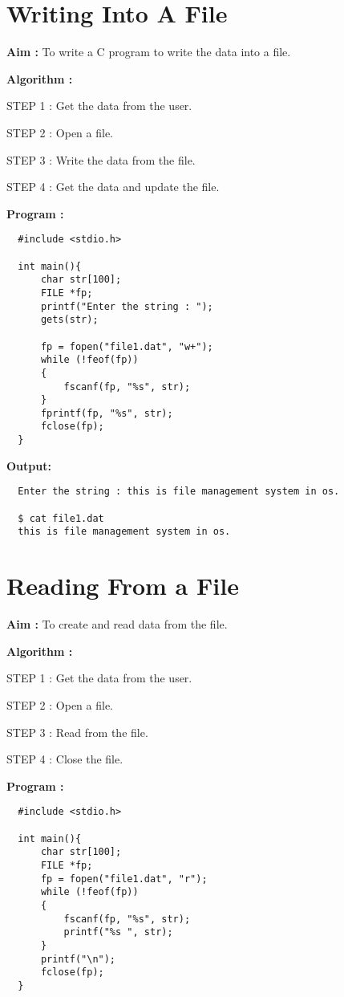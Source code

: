 \documentclass[journal,onecolumn]{IEEEtran}
\begin{document}
\section{Writing Into A File}
\textbf{Aim : } To write a C program to write the data into a file.

\textbf{Algorithm : }
\begin{list}{}{}
  \item STEP 1 : Get the data from the user. 
  \item STEP 2 : Open a file.
  \item STEP 3 : Write the data from the file. 
  \item STEP 4 : Get the data and update the file.
\end{list}

\textbf{Program : }
\begin{verbatim}
  #include <stdio.h>

  int main(){
      char str[100];
      FILE *fp;
      printf("Enter the string : ");
      gets(str);
      
      fp = fopen("file1.dat", "w+");
      while (!feof(fp))
      {
          fscanf(fp, "%s", str);
      }
      fprintf(fp, "%s", str);
      fclose(fp);
  }
\end{verbatim}

\textbf{Output:}
\begin{verbatim}
  Enter the string : this is file management system in os.

  $ cat file1.dat 
  this is file management system in os.
\end{verbatim}

\section{Reading From a File}
\textbf{Aim :} To create and read data from the file.

\textbf{Algorithm :}
\begin{list}{}{}
  \item STEP 1 : Get the data from the user.
  \item STEP 2 : Open a file.
  \item STEP 3 : Read from the file. 
  \item STEP 4 : Close the file.
\end{list}


\textbf{Program :}
\begin{verbatim}
  #include <stdio.h>

  int main(){
      char str[100];
      FILE *fp;
      fp = fopen("file1.dat", "r");
      while (!feof(fp))
      {
          fscanf(fp, "%s", str);
          printf("%s ", str);
      }
      printf("\n");
      fclose(fp);
  }
\end{verbatim}
\end{document}

